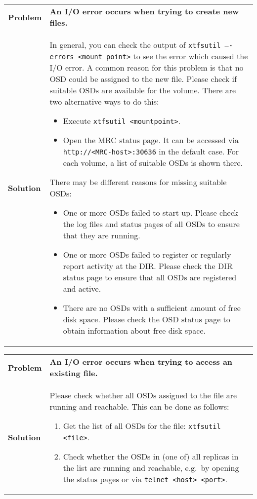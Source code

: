 \documentclass[a4paper,10pt]{book}
\begin{document}
\begin{tabular}{lp{10cm}}
 \textbf{Problem}  & \textbf{An I/O error occurs when trying to create new files.} \\
 \textbf{Solution} & In general, you can check the output of \texttt{xtfsutil ----errors <mount point>} to see the error which caused the I/O error. A common reason for this problem is that no OSD could be assigned to the new file. Please check if suitable OSDs are available for the volume. There are two alternative ways to do this:
   \begin{itemize}
     \item Execute \texttt{xtfsutil <mountpoint>}.
     \item Open the MRC status page. It can be accessed via \texttt{http://<MRC-host>:30636} in the default case. For each volume, a list of suitable OSDs is shown there.
   \end{itemize}
 There may be different reasons for missing suitable OSDs:
   \begin{itemize}
    \item One or more OSDs failed to start up. Please check the log files and status pages of all OSDs to ensure that they are running.
    \item One or more OSDs failed to register or regularly report activity at the DIR. Please check the DIR status page to ensure that all OSDs are registered and active.
    \item There are no OSDs with a sufficient amount of free disk space. Please check the OSD status page to obtain information about free disk space.
   \end{itemize}
\end{tabular}

\begin{tabular}{lp{10cm}}
 \textbf{Problem}  & \textbf{An I/O error occurs when trying to access an existing file.}\\
 \textbf{Solution} & Please check whether all OSDs assigned to the file are running and reachable. This can be done as follows:
    \begin{enumerate}
     \item Get the list of all OSDs for the file: \texttt{xtfsutil <file>}.
     \item Check whether the OSDs in (one of) all replicas in the list are running and reachable, e.g.\ by opening the status pages or via \texttt{telnet <host> <port>}.
    \end{enumerate}
\end{tabular}
\end{document}
